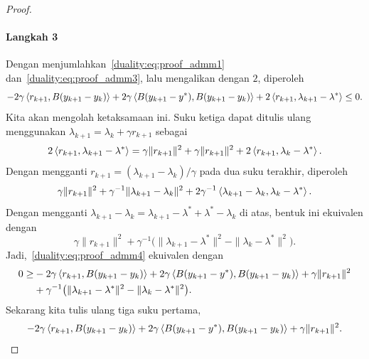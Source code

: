 \begin{proof}
    \paragraph{Langkah 3}
    Dengan menjumlahkan~\eqref{duality:eq:proof_admm1} dan~\eqref{duality:eq:proof_admm3}, lalu mengalikan dengan $2$, diperoleh
    \begin{equation}\label{duality:eq:proof_admm4}
        -2\gamma \left\langle r_{k+1} , B(y_{k+1}-y_k)\right\rangle + 2\gamma\left\langle B(y_{k+1}-y^*) , B(y_{k+1}-y_k)\right\rangle + 2\left\langle r_{k+1} , \lambda_{k+1}-\lambda^*\right\rangle\leq 0.
    \end{equation}
    Kita akan mengolah ketaksamaan ini. Suku ketiga dapat ditulis ulang menggunakan $\lambda_{k+1} = \lambda_k + \gamma r_{k+1}$ sebagai
    \begin{equation}
        2\left\langle r_{k+1} , \lambda_{k+1}-\lambda^*\right\rangle
        = \gamma\|r_{k+1}\|^2 + \gamma\|r_{k+1}\|^2 + 2\left\langle r_{k+1} , \lambda_k -\lambda^*\right\rangle.
    \end{equation}
    Dengan mengganti $r_{k+1} = (\lambda_{k+1}-\lambda_k)/\gamma$ pada dua suku terakhir, diperoleh
    \begin{equation}
        \gamma\|r_{k+1}\|^2 + \gamma^{-1}\|\lambda_{k+1}-\lambda_k\|^2 + 2\gamma^{-1}\left\langle\lambda_{k+1}-\lambda_k , \lambda_k -\lambda^*\right\rangle.
    \end{equation}
    Dengan mengganti $\lambda_{k+1}-\lambda_k = \lambda_{k+1}-\lambda^* + \lambda^* - \lambda_k$ di atas, bentuk ini ekuivalen dengan
    \begin{equation}
        \gamma\|r_{k+1}\|^2 + \gamma^{-1}\big(\|\lambda_{k+1}-\lambda^*\|^2 - \|\lambda_{k}-\lambda^*\|^2\big).
    \end{equation}
    Jadi,~\eqref{duality:eq:proof_admm4} ekuivalen dengan
    \begin{equation}\label{duality:eq:proof_admm5}
        \begin{aligned}
            0\geq&-2\gamma \left\langle r_{k+1} , B(y_{k+1}-y_k)\right\rangle + 2\gamma\left\langle B(y_{k+1}-y^*) , B(y_{k+1}-y_k)\right\rangle + \gamma\|r_{k+1}\|^2 \\
            &+ \gamma^{-1}\big(\|\lambda_{k+1}-\lambda^*\|^2 - \|\lambda_{k}-\lambda^*\|^2\big).
        \end{aligned}
    \end{equation}
    Sekarang kita tulis ulang tiga suku pertama,
    \begin{equation}\label{duality:eq:proof_admm6}
        -2\gamma \inner{r_{k+1}}{B(y_{k+1}-y_k)} + 2\gamma\inner{B(y_{k+1}-y^*)}{B(y_{k+1}-y_k)} + \gamma\|r_{k+1}\|^2.

\end{equation}
\end{proof}
